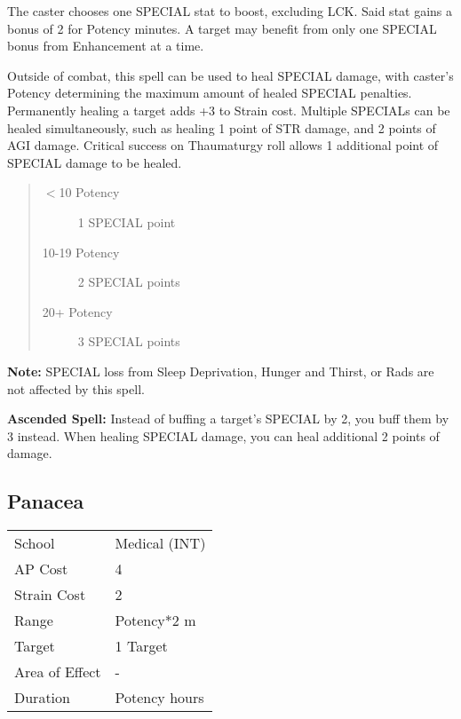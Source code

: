 \documentclass[11pt,a4paper,twocolumn]{book}
\begin{document}
The caster chooses one SPECIAL stat to boost, excluding LCK. Said stat gains a bonus of 2 for Potency minutes. A target may benefit from only one SPECIAL bonus from Enhancement at a time.

Outside of combat, this spell can be used to heal SPECIAL damage, with caster's Potency determining the maximum amount of healed SPECIAL penalties. Permanently healing a target adds +3 to Strain cost. Multiple SPECIALs can be healed simultaneously, such as healing 1 point of STR damage, and 2 points of AGI damage. Critical success on Thaumaturgy roll allows 1 additional point of SPECIAL damage to be healed.

\begin{quote}
	\begin{description}
		\item[$<$10 Potency] 	1 SPECIAL point
		\item[10-19 Potency] 	2 SPECIAL points
		\item[20+ Potency] 		3 SPECIAL points
	\end{description}	
\end{quote}

\textbf{Note:} SPECIAL loss from Sleep Deprivation, Hunger and Thirst, or Rads are not affected by this spell.

\bigskip

\textbf{Ascended Spell:} Instead of buffing a target's SPECIAL by 2, you buff them by 3 instead. When healing SPECIAL damage, you can heal additional 2 points of damage.

\subsection*{Panacea}
{
	\begin{tabu} to 75mm{| X[l,4] | X[l,7] |}
		\hline
		School 			& Medical (INT) 		\\
		AP Cost	      	& 4 					\\
		Strain Cost     & 2 					\\
		Range     		& Potency*2	m			\\
		Target      	& 1 Target				\\
		Area of Effect  & -  	 				\\
		Duration     	& Potency hours			\\ \hline
	\end{tabu}
	
}
\end{document}
